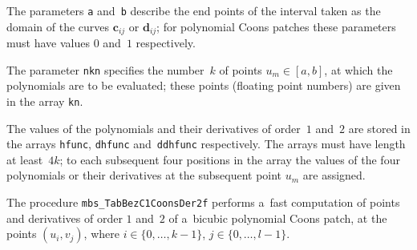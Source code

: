 The parameters \texttt{a} and~\texttt{b} describe the end points of the
interval taken as the domain of the curves $\bm{c}_{ij}$ or $\bm{d}_{ij}$;
for polynomial Coons patches these parameters must have values
$0$ and~$1$ respectively.

The parameter \texttt{nkn} specifies the number~$k$ of points $u_m\in[a,b]$,
at which the polynomials are to be evaluated; these points
(floating point numbers) are given in the array \texttt{kn}.

The values of the polynomials and their derivatives of order~$1$ and~$2$
are stored in the arrays \texttt{hfunc}, \texttt{dhfunc} and~\texttt{ddhfunc}
respectively.
The arrays must have length at least~$4k$; to each subsequent four positions
in the array the values of the four polynomials or their derivatives at
the subsequent point $u_m$ are assigned.

\vspace{\bigskipamount}


\vspace{\bigskipamount}
The procedure \texttt{mbs\_TabBezC1CoonsDer2f} performs a~fast computation
of points and derivatives of order $1$ and~$2$ of a~bicubic polynomial Coons
patch, at the points $(u_i,v_j)$, where $i\in\{0,\ldots,k-1\}$,
$j\in\{0,\ldots,l-1\}$.

